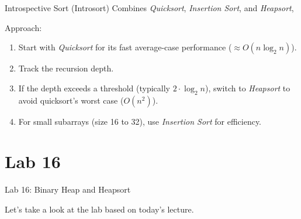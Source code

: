 \documentclass[14pt,aspectratio=1610]{beamer}
\begin{document}
\begin{frame}{Introspective Sort (Introsort)}
  Combines \emph{Quicksort}, \emph{Insertion Sort}, and \emph{Heapsort},

  Approach:

  \begin{enumerate}
    \item 
      Start with \emph{Quicksort} for its fast average-case performance (\(\approx O(n \log_2 n)\)).

    \item 
      Track the recursion depth.

    \item 
      If the depth exceeds a threshold (typically \(2 \cdot{} \log_2 n\)), switch to \emph{Heapsort} to avoid quicksort's worst case (\(O(n^2)\)).

    \item 
      For small subarrays (size 16 to 32), use \emph{Insertion Sort} for efficiency.
  \end{enumerate}
\end{frame}


\section*{Lab 16}
\begin{frame}{Lab 16: Binary Heap and Heapsort}
\begin{center}\Large
Let's take a look at the lab based on today's lecture.
\end{center}
\end{frame}
\end{document}
